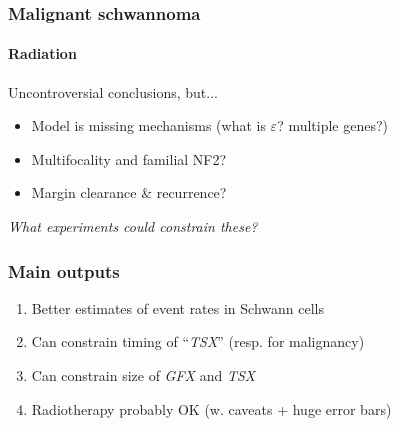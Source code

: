\documentclass{beamer}
\begin{document}
\begin{frame}
\begin{columns}
\begin{column}{0.5\textwidth}
        \end{column}
    \end{columns}
\end{frame}


\begin{frame}
    \frametitle{Malignant schwannoma}
    \framesubtitle{Radiation}
    Uncontroversial conclusions, but...

    \begin{itemize}
        \item Model is missing mechanisms (what is $\varepsilon$? multiple genes?)
        \item Multifocality and familial NF2?
        \item Margin clearance \& recurrence?
    \end{itemize}
        \begin{center}
            \emph{What experiments could constrain these?}
        \end{center}
\end{frame}

%

\begin{frame}
    \frametitle{Main outputs}
    \begin{enumerate}
        \item Better estimates of event rates in Schwann cells
        \item Can constrain timing of ``\emph{TSX}'' (resp. for malignancy)
        \item Can constrain size of \emph{GFX} and \emph{TSX}
        \item Radiotherapy probably OK (w. caveats + huge error bars)
    \end{enumerate}
\end{frame}
\end{document}
